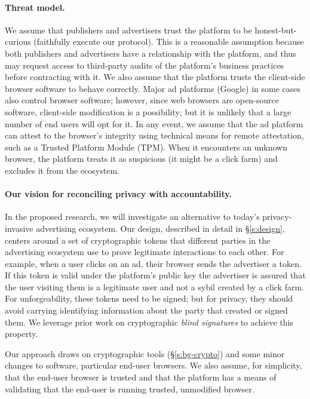 \paragraph{Threat model.}
%
We assume that publishers and advertisers trust the platform to be honest-but-curious (\ie faithfully execute our protocol). 
%
This is a reasonable assumption because both publishers and advertisers have a relationship with the platform, and thus may request access to third-party audits of the platform's business practices before contracting with it.  
%
We also assume that the platform trusts the client-side browser software to behave correctly.
%
Major ad platforms (\eg Google) in some cases also control browser software; however, since web browsers are open-source software, client-side modification is a possibility; but it is unlikely that a large number of end users will opt for it.
%
In any event, we assume that the ad platform can attest to the browser's integrity using technical means for remote attestation, such as a Trusted Platform Module (TPM).
%
When it encounters an unknown browser, the platform treats it as suspicious (\ie it might be a click farm) and excludes it from the ecosystem.
%

\paragraph{Our vision for reconciling privacy with accountability.}
%
In the proposed research, we will investigate an alternative to today's privacy-invasive
advertising ecosystem.
%
Our design, described in detail in \S\ref{s:design}, centers around a set of cryptographic tokens that different parties in the advertising ecosystem use to prove legitimate interactions to each other.
%
For example, when a user clicks on an ad, their browser sends the advertiser a token.  If this token is valid under the platform's public key the advertiser is assured that the user visiting them is a legitimate user and not a sybil created by a click farm.
%
For unforgeability, these tokens need to be signed; but for privacy, they should avoid carrying identifying information about the party that created or signed them.
%
We leverage prior work on cryptographic \emph{blind signatures} to achieve this property.
%

%
Our approach draws on cryptographic tools (\S\ref{s:bg-crypto}) and some minor changes to software, particular end-user browsers.
%
We also assume, for simplicity, that the end-user browser is trusted and that the platform has a means of validating that the end-user is running trusted, unmodified browser.
%

